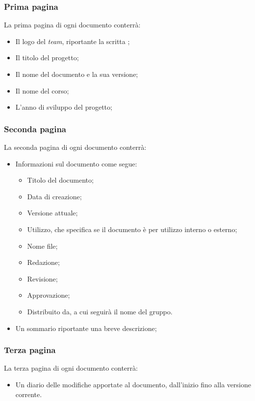 \subsubsection{Prima pagina}
La prima pagina di ogni documento conterrà:
\begin{itemize}
\item Il logo del \textit{team}, riportante la scritta \gruppo;
\item Il titolo del progetto;
\item Il nome del documento e la sua versione;
\item Il nome del corso;
\item L'anno di sviluppo del progetto;
\end{itemize}

\subsubsection{Seconda pagina}
La seconda pagina di ogni documento conterrà:
\begin{itemize}
\item  Informazioni sul documento come segue:
\begin{itemize}
\item Titolo del documento;
\item Data di creazione;
\item Versione attuale;
\item Utilizzo, che specifica se il documento è per utilizzo interno o esterno;
\item Nome file;
\item Redazione;
\item Revisione;
\item Approvazione;
\item Distribuito da, a cui seguirà il nome del gruppo.
\end{itemize}
\item Un sommario riportante una breve descrizione;
\end{itemize}

\subsubsection{Terza pagina}
La terza pagina di ogni documento conterrà:
\begin{itemize}
\item Un diario delle modifiche apportate al documento, dall'inizio fino alla versione corrente.
\end{itemize}

